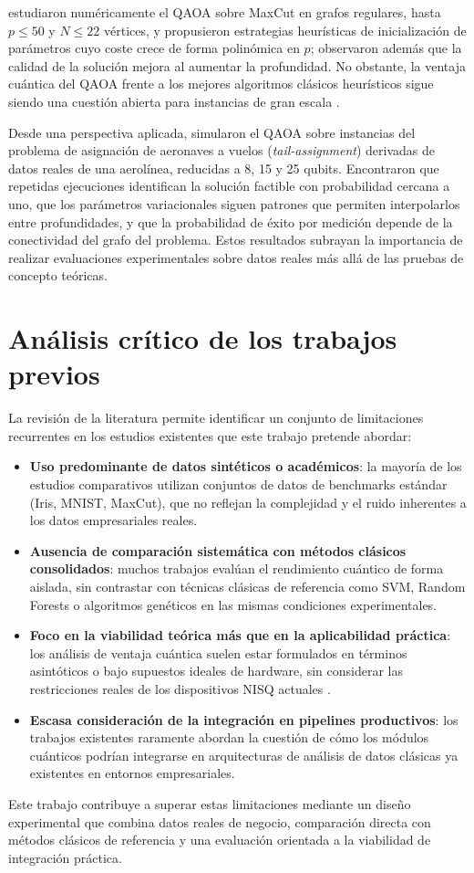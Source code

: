 \cite{zhou2020} estudiaron numéricamente el QAOA sobre MaxCut en grafos regulares, hasta $p\leq 50$ y $N\leq 22$ vértices, y propusieron estrategias heurísticas de inicialización de parámetros cuyo coste crece de forma polinómica en $p$; observaron además que la calidad de la solución mejora al aumentar la profundidad. No obstante, la ventaja cuántica del QAOA frente a los mejores algoritmos clásicos heurísticos sigue siendo una cuestión abierta para instancias de gran escala \citep{farhi2014}.

Desde una perspectiva aplicada, \cite{vikstaal2020} simularon el QAOA sobre instancias del problema de asignación de aeronaves a vuelos (\textit{tail-assignment}) derivadas de datos reales de una aerolínea, reducidas a 8, 15 y 25 qubits. Encontraron que repetidas ejecuciones identifican la solución factible con probabilidad cercana a uno, que los parámetros variacionales siguen patrones que permiten interpolarlos entre profundidades, y que la probabilidad de éxito por medición depende de la conectividad del grafo del problema. Estos resultados subrayan la importancia de realizar evaluaciones experimentales sobre datos reales más allá de las pruebas de concepto teóricas.

\section{Análisis crítico de los trabajos previos}

La revisión de la literatura permite identificar un conjunto de limitaciones recurrentes en los estudios existentes que este trabajo pretende abordar:

\begin{itemize}
    \item \textbf{Uso predominante de datos sintéticos o académicos}: la mayoría de los estudios comparativos utilizan conjuntos de datos de benchmarks estándar (Iris, MNIST, MaxCut), que no reflejan la complejidad y el ruido inherentes a los datos empresariales reales.

    \item \textbf{Ausencia de comparación sistemática con métodos clásicos consolidados}: muchos trabajos evalúan el rendimiento cuántico de forma aislada, sin contrastar con técnicas clásicas de referencia como SVM, Random Forests o algoritmos genéticos en las mismas condiciones experimentales.

    \item \textbf{Foco en la viabilidad teórica más que en la aplicabilidad práctica}: los análisis de ventaja cuántica suelen estar formulados en términos asintóticos o bajo supuestos ideales de hardware, sin considerar las restricciones reales de los dispositivos NISQ actuales \citep{preskill2018}.

    \item \textbf{Escasa consideración de la integración en pipelines productivos}: los trabajos existentes raramente abordan la cuestión de cómo los módulos cuánticos podrían integrarse en arquitecturas de análisis de datos clásicas ya existentes en entornos empresariales.
\end{itemize}

Este trabajo contribuye a superar estas limitaciones mediante un diseño experimental que combina datos reales de negocio, comparación directa con métodos clásicos de referencia y una evaluación orientada a la viabilidad de integración práctica.